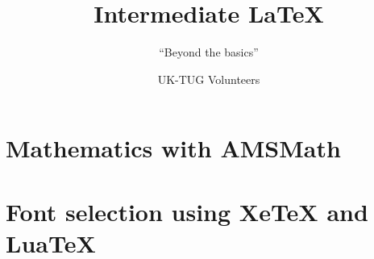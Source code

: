 \usepackage[T1]{fontenc}
\usepackage{babel,booktabs,csquotes,lmodern,tikz,verbatim}

\newcommand*{\cls}[1]{\textsf{#1}}
\newcommand*{\cs}[1]{\texttt{\char`\\#1}}
\newcommand*{\marg}[1]{\texttt{\char`\{#1\char`\}}}
\newcommand*{\meta}[1]{\ensuremath{\langle}\emph{#1}\ensuremath{\rangle}}
\newcommand*{\oarg}[1]{\texttt{[#1]}}
\newcommand*{\pkg}[1]{\textsf{#1}}

\renewcommand*{\LaTeX}{LaTeX}
\renewcommand*{\LaTeXe}{LaTeX2e}
\renewcommand*{\TeX}{TeX}

\newcommand*{\BibTeX}{BibTeX}
\newcommand*{\LuaTeX}{LuaTeX}
\newcommand*{\pdfTeX}{pdfTeX}
\newcommand*{\XeTeX}{XeTeX}

\title{Intermediate \LaTeX{}}
\subtitle{\enquote{Beyond the basics}}
\author{UK-TUG Volunteers}
\date{}



\begin{frame}
  \titlepage
\end{frame}



\section{Mathematics with AMSMath}

\section{Font selection using \XeTeX{} and \LuaTeX{}}

